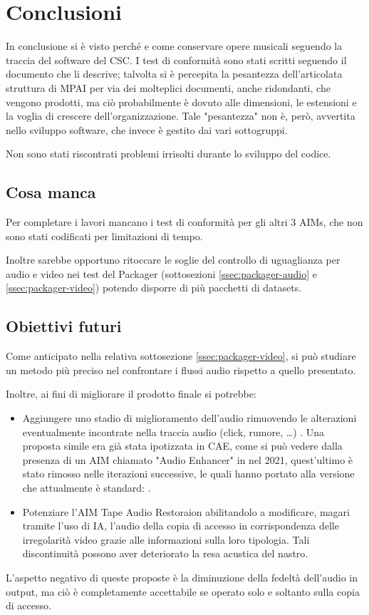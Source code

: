 
\chapter{Conclusioni} \label{chp:conclusioni}
In conclusione si è visto perché e come conservare opere musicali seguendo la traccia del software del \ac{CSC}.
I test di conformità sono stati scritti seguendo il documento che li descrive; talvolta si è percepita la pesantezza dell'articolata struttura di \ac{MPAI} per via dei molteplici documenti, anche ridondanti, che vengono prodotti, ma ciò probabilmente è dovuto alle dimensioni, le estensioni e la voglia di crescere dell'organizzazione. Tale "pesantezza" non è, però, avvertita nello sviluppo software, che invece è gestito dai vari sottogruppi.   %

Non sono stati riscontrati problemi irrisolti durante lo sviluppo del codice.


\section{Cosa manca}  %
Per completare i lavori mancano i test di conformità per gli altri 3 \acp{AIM}, che non sono stati codificati per limitazioni di tempo.

Inoltre sarebbe opportuno ritoccare le soglie del controllo di uguaglianza per audio e video nei test del Packager (sottosezioni \ref{ssec:packager-audio} e \ref{ssec:packager-video}) potendo disporre di più pacchetti di datasets.


\section{Obiettivi futuri}  %
Come anticipato nella relativa sottosezione \ref{ssec:packager-video}, si può studiare un metodo più preciso nel confrontare i flussi audio rispetto a quello presentato.

Inoltre, ai fini di migliorare il prodotto finale si potrebbe:
\begin{itemize}
    \item Aggiungere uno stadio di miglioramento dell'audio rimuovendo le alterazioni eventualmente incontrate nella traccia audio (click, rumore, \dots) \cite{godsillDigitalAudioRestoration1998}.
    Una proposta simile era già stata ipotizzata in \ac{CAE}, come si può vedere dalla presenza di un \ac{AIM} chiamato "Audio Enhancer" in \cite{mpaiMPAICAEUseCases2021} nel 2021, quest'ultimo è stato rimosso nelle iterazioni successive, le quali hanno portato alla versione che attualmente è standard: .
    \item Potenziare l'\ac{AIM} Tape Audio Restoraion abilitandolo a modificare, magari tramite l'uso di \acl{IA}, l'audio della copia di accesso in corrispondenza delle irregolarità video grazie alle informazioni sulla loro tipologia. Tali discontinuità possono aver deteriorato la resa acustica del nastro.
\end{itemize}

L'aspetto negativo di queste proposte è la diminuzione della fedeltà dell'audio in output, ma ciò è completamente accettabile se operato solo e soltanto sulla copia di accesso.
